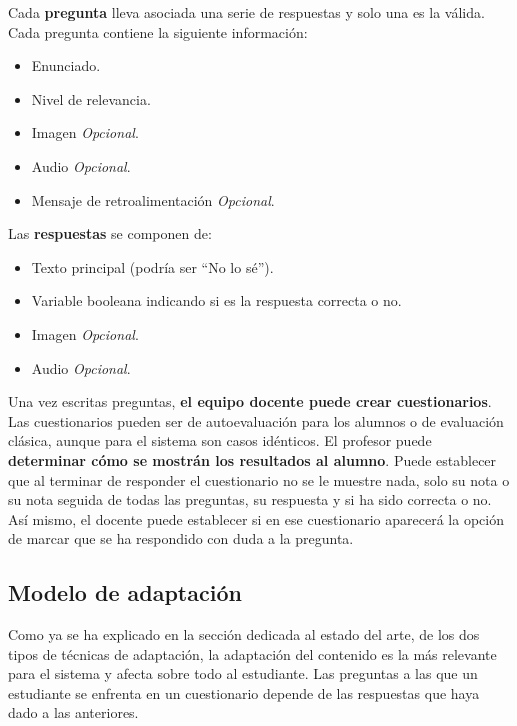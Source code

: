 Cada \textbf{pregunta} lleva asociada una serie de respuestas y solo una es la válida. Cada pregunta contiene la siguiente información:

\begin{itemize}
	\item Enunciado.
	\item Nivel de relevancia.
	\item Imagen \textit{Opcional}.
	\item Audio \textit{Opcional}.
	\item Mensaje de retroalimentación \textit{Opcional}.
\end{itemize}

Las \textbf{respuestas} se componen de:

\begin{itemize}
	\item Texto principal (podría ser ``No lo sé'').
	\item Variable booleana indicando si es la respuesta correcta o no.
	\item Imagen \textit{Opcional}.
	\item Audio \textit{Opcional}.
\end{itemize}

Una vez escritas preguntas, \textbf{el equipo docente puede crear cuestionarios}. Las cuestionarios pueden ser de autoevaluación para los alumnos o de evaluación clásica, aunque para el sistema son casos idénticos. El profesor puede \textbf{determinar cómo se mostrán los resultados al alumno}. Puede establecer que al terminar de responder el cuestionario no se le muestre nada, solo su nota o su nota seguida de todas las preguntas, su respuesta y si ha sido correcta o no. Así mismo, el docente puede establecer si en ese cuestionario aparecerá la opción de marcar que se ha respondido con duda a la pregunta.


\subsection{Modelo de adaptación\label{sec:modelo adapatacion}}

Como ya se ha explicado en la sección dedicada al estado del arte, de los dos tipos de técnicas de adaptación, la adaptación del contenido es la más relevante para el sistema y afecta sobre todo al estudiante. Las preguntas a las que un estudiante se enfrenta en un cuestionario depende de las respuestas que haya dado a las anteriores.

